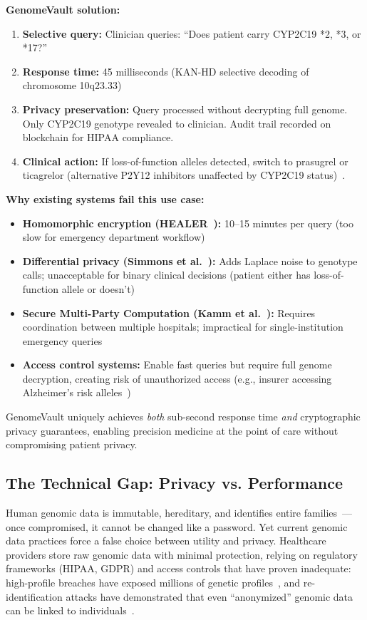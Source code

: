 \documentclass[12pt,a4paper]{article}
\begin{document}
\textbf{GenomeVault solution:}
\begin{enumerate}
\item \textbf{Selective query:} Clinician queries: ``Does patient carry CYP2C19 *2, *3, or *17?''
\item \textbf{Response time:} 45 milliseconds (KAN-HD selective decoding of chromosome 10q23.33)
\item \textbf{Privacy preservation:} Query processed without decrypting full genome. Only CYP2C19 genotype revealed to clinician. Audit trail recorded on blockchain for HIPAA compliance.
\item \textbf{Clinical action:} If loss-of-function alleles detected, switch to prasugrel or ticagrelor (alternative P2Y12 inhibitors unaffected by CYP2C19 status)~\cite{Levine2016}.
\end{enumerate}

\textbf{Why existing systems fail this use case:}
\begin{itemize}
\item \textbf{Homomorphic encryption (HEALER~\cite{healer2020}):} 10--15 minutes per query (too slow for emergency department workflow)
\item \textbf{Differential privacy (Simmons et al.~\cite{Simmons2016}):} Adds Laplace noise to genotype calls; unacceptable for binary clinical decisions (patient either has loss-of-function allele or doesn't)
\item \textbf{Secure Multi-Party Computation (Kamm et al.~\cite{Kamm2013}):} Requires coordination between multiple hospitals; impractical for single-institution emergency queries
\item \textbf{Access control systems:} Enable fast queries but require full genome decryption, creating risk of unauthorized access (e.g., insurer accessing Alzheimer's risk alleles~\cite{Erlich2018})
\end{itemize}

GenomeVault uniquely achieves \textit{both} sub-second response time \textit{and} cryptographic privacy guarantees, enabling precision medicine at the point of care without compromising patient privacy.

\subsection{The Technical Gap: Privacy vs. Performance}

Human genomic data is immutable, hereditary, and identifies entire families~\cite{Erlich2018}---once compromised, it cannot be changed like a password. Yet current genomic data practices force a false choice between utility and privacy. Healthcare providers store raw genomic data with minimal protection, relying on regulatory frameworks (HIPAA, GDPR) and access controls that have proven inadequate: high-profile breaches have exposed millions of genetic profiles~\cite{Wan2017}, and re-identification attacks have demonstrated that even ``anonymized'' genomic data can be linked to individuals~\cite{Homer2008, Gymrek2013}.
\end{document}
